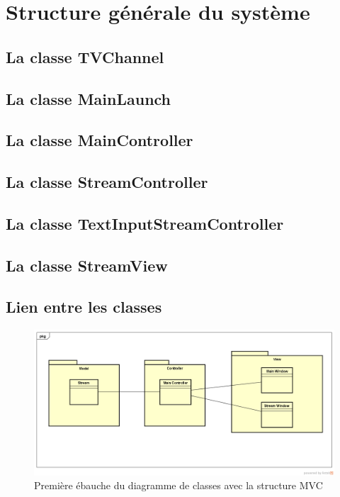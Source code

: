\documentclass{polytech/polytech}
\begin{document}
\section{Structure générale du système}


\subsection{La classe TVChannel}

\subsection{La classe MainLaunch}

\subsection{La classe MainController}

\subsection{La classe StreamController}

\subsection{La classe TextInputStreamController}

\subsection{La classe StreamView}


\subsection{Lien entre les classes}

\begin{figure}
	\includegraphics[scale=0.25]{images/ClassDiagram.png}
	\caption{Première ébauche du diagramme de classes avec la structure MVC}
	\label{fig:classdiag1}
\end{figure}
\end{document}
